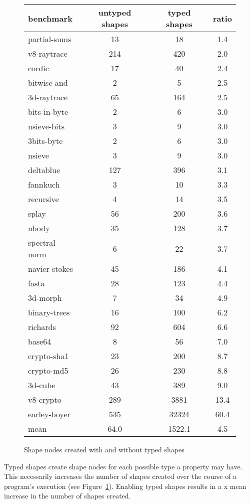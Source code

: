 \documentclass[preprint]{sigplanconf}
\newcommand{\stat}[1]{\unskip}
\begin{document}
\begin{figure}[tb]
\begin{center}
\begin{tabular}{l | c | c | c}
\hline
benchmark&untyped shapes&typed shapes&ratio\\
\hline
partial-sums&13&18&1.4\\
v8-raytrace&214&420&2.0\\
cordic&17&40&2.4\\
bitwise-and&2&5&2.5\\
3d-raytrace&65&164&2.5\\
bits-in-byte&2&6&3.0\\
nsieve-bits&3&9&3.0\\
3bits-byte&2&6&3.0\\
nsieve&3&9&3.0\\
deltablue&127&396&3.1\\
fannkuch&3&10&3.3\\
recursive&4&14&3.5\\
splay&56&200&3.6\\
nbody&35&128&3.7\\
spectral-norm&6&22&3.7\\
navier-stokes&45&186&4.1\\
fasta&28&123&4.4\\
3d-morph&7&34&4.9\\
binary-trees&16&100&6.2\\
richards&92&604&6.6\\
base64&8&56&7.0\\
crypto-sha1&23&200&8.7\\
crypto-md5&26&230&8.8\\
3d-cube&43&389&9.0\\
v8-crypto&289&3881&13.4\\
earley-boyer&535&32324&60.4\\
\hline
mean&64.0&1522.1&4.5\\
\hline
\end{tabular}
 \end{center}
\caption{Shape nodes created with and without typed shapes\label{fig:num_shapes}}
\end{figure}

Typed shapes create shape nodes for each possible type a property may have.
This necessarily increases the number of shapes created over the course of
a program's execution (see Figure~\ref{fig:num_shapes}). Enabling typed shapes
results in a \stat{numshapes_ratio_mean}x mean increase in the number of shapes
created.
\end{document}
